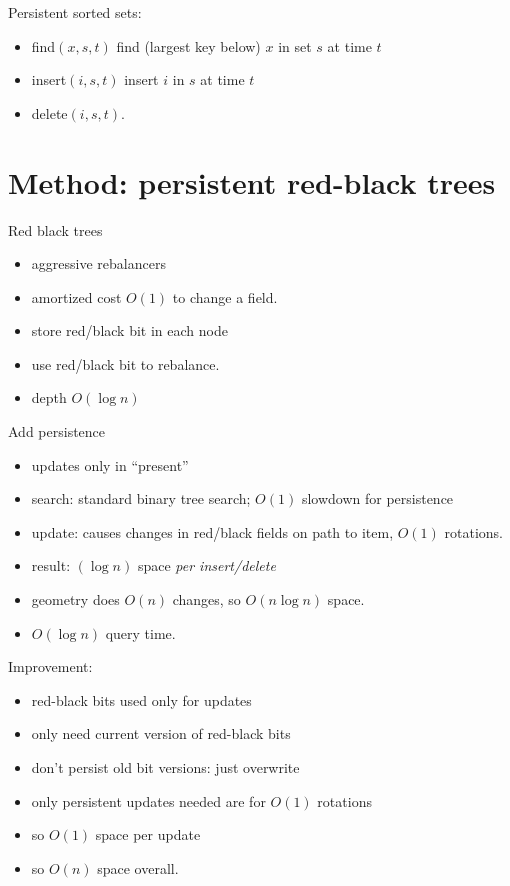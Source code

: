 \documentclass{article}
\begin{document}
Persistent sorted sets:
\begin{itemize}
\item find$(x,s,t)$ find (largest key below) $x$ in set $s$ at time $t$
\item insert$(i,s,t)$ insert $i$ in $s$ at time $t$
\item delete$(i,s,t)$.
\end{itemize}




\section{Method: persistent red-black trees}

Red black trees
\begin{itemize}
\item aggressive rebalancers
\item amortized cost $O(1)$ to change a field.
\item store red/black bit in each node
\item use red/black bit to rebalance.
\item depth $O(\log n)$
\end{itemize}

Add persistence
\begin{itemize}
\item updates only in ``present''
\item search: standard binary tree search; $O(1)$ slowdown for persistence
\item update: causes changes in red/black fields on path to item,
  $O(1)$ rotations.
\item result: $(\log n)$ space \emph{per insert/delete}
\item geometry does $O(n)$ changes, so $O(n\log n)$ space.
\item $O(\log n)$ query time.
\end{itemize}

Improvement:
\begin{itemize}
\item red-black bits used only for updates
\item only need current version of red-black bits
\item don't persist old bit versions: just overwrite
\item only persistent updates needed are for $O(1)$ rotations
\item so $O(1)$ space per update
\item so $O(n)$ space overall.
\end{itemize}
\end{document}
